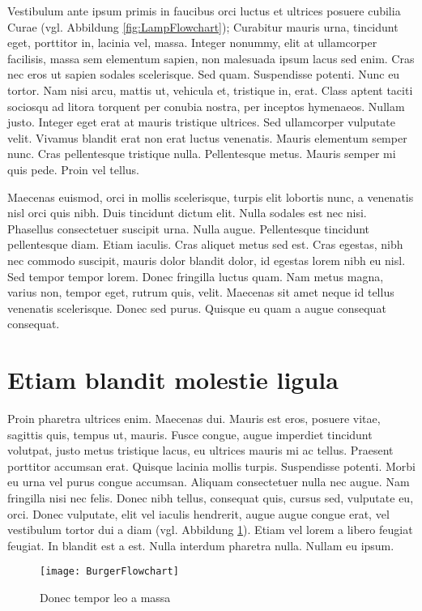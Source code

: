 Vestibulum ante ipsum primis in faucibus orci luctus et ultrices posuere cubilia Curae (vgl. Abbildung \ref{fig:LampFlowchart}); Curabitur mauris urna, tincidunt eget, porttitor in, lacinia vel, massa. Integer nonummy, elit at ullamcorper facilisis, massa sem elementum sapien, non malesuada ipsum lacus sed enim. Cras nec eros ut sapien sodales scelerisque. Sed quam. Suspendisse potenti. Nunc eu tortor. Nam nisi arcu, mattis ut, vehicula et, tristique in, erat. Class aptent taciti sociosqu ad litora torquent per conubia nostra, per inceptos hymenaeos. Nullam justo. Integer eget erat at mauris tristique ultrices. Sed ullamcorper vulputate velit. Vivamus blandit erat non erat luctus venenatis. Mauris elementum semper nunc. Cras pellentesque tristique nulla. Pellentesque metus. Mauris semper mi quis pede. Proin vel tellus.

Maecenas euismod, orci in mollis scelerisque, turpis elit lobortis nunc, a venenatis nisl orci quis nibh. Duis tincidunt dictum elit. Nulla sodales est nec nisi. Phasellus consectetuer suscipit urna. Nulla augue. Pellentesque tincidunt pellentesque diam. Etiam iaculis. Cras aliquet metus sed est. Cras egestas, nibh nec commodo suscipit, mauris dolor blandit dolor, id egestas lorem nibh eu nisl. Sed tempor tempor lorem. Donec fringilla luctus quam. Nam metus magna, varius non, tempor eget, rutrum quis, velit. Maecenas sit amet neque id tellus venenatis scelerisque. Donec sed purus. Quisque eu quam a augue consequat consequat.

\section{Etiam blandit molestie ligula}

Proin pharetra ultrices enim. Maecenas dui. Mauris est eros, posuere vitae, sagittis quis, tempus ut, mauris. Fusce congue, augue imperdiet tincidunt volutpat, justo metus tristique lacus, eu ultrices mauris mi ac tellus. Praesent porttitor accumsan erat. Quisque lacinia mollis turpis. Suspendisse potenti. Morbi eu urna vel purus congue accumsan. Aliquam consectetuer nulla nec augue. Nam fringilla nisi nec felis. Donec nibh tellus, consequat quis, cursus sed, vulputate eu, orci. Donec vulputate, elit vel iaculis hendrerit, augue augue congue erat, vel vestibulum tortor dui a diam (vgl. Abbildung \ref{fig:BurgerFlowchart}). Etiam vel lorem a libero feugiat feugiat. In blandit est a est. Nulla interdum pharetra nulla. Nullam eu ipsum.

\begin{figure}[htb]
  \centering
  \texttt{[image: BurgerFlowchart]}\\ %
  \caption{Donec tempor leo a massa \cite{scrguide07}}\label{fig:BurgerFlowchart}
\end{figure}

